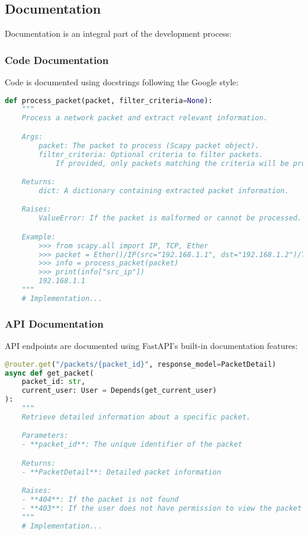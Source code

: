 \subsection{Documentation}
Documentation is an integral part of the development process:

\subsubsection{Code Documentation}
Code is documented using docstrings following the Google style:

\begin{lstlisting}[language=python, caption=Docstring Example]
def process_packet(packet, filter_criteria=None):
    """
    Process a network packet and extract relevant information.

    Args:
        packet: The packet to process (Scapy packet object).
        filter_criteria: Optional criteria to filter packets.
            If provided, only packets matching the criteria will be processed.

    Returns:
        dict: A dictionary containing extracted packet information.

    Raises:
        ValueError: If the packet is malformed or cannot be processed.

    Example:
        >>> from scapy.all import IP, TCP, Ether
        >>> packet = Ether()/IP(src="192.168.1.1", dst="192.168.1.2")/TCP()
        >>> info = process_packet(packet)
        >>> print(info["src_ip"])
        192.168.1.1
    """
    # Implementation...
\end{lstlisting}

\subsubsection{API Documentation}
API endpoints are documented using FastAPI's built-in documentation features:

\begin{lstlisting}[language=python, caption=API Documentation Example]
@router.get("/packets/{packet_id}", response_model=PacketDetail)
async def get_packet(
    packet_id: str,
    current_user: User = Depends(get_current_user)
):
    """
    Retrieve detailed information about a specific packet.

    Parameters:
    - **packet_id**: The unique identifier of the packet

    Returns:
    - **PacketDetail**: Detailed packet information

    Raises:
    - **404**: If the packet is not found
    - **403**: If the user does not have permission to view the packet
    """
    # Implementation...
\end{lstlisting}

